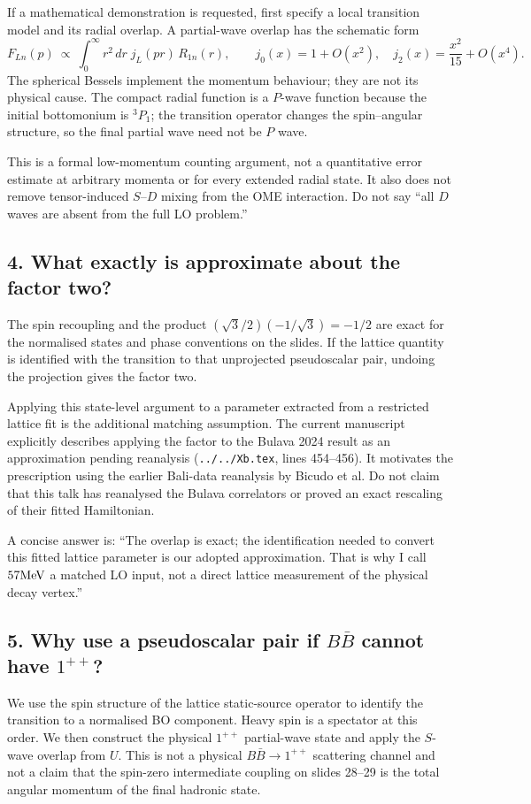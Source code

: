\documentclass[11pt,a4paper]{article}
\begin{document}
If a mathematical demonstration is requested, first specify a local
transition model and its radial overlap. A partial-wave overlap has the
schematic form
\[
 F_{Ln}(p)\ \propto\ \int_0^\infty r^2\,dr\;j_L(pr)\,R_{1n}(r),
 \qquad
 j_0(x)=1+O(x^2),\quad j_2(x)=\frac{x^2}{15}+O(x^4).
\]
The spherical Bessels implement the momentum behaviour; they are not its
physical cause. The compact radial function is a $P$-wave function because
the initial bottomonium is ${}^3P_1$; the transition operator changes the
spin--angular structure, so the final partial wave need not be $P$ wave.

This is a formal low-momentum counting argument, not a quantitative
error estimate at arbitrary momenta or for every extended radial state.
It also does not remove tensor-induced $S$--$D$ mixing from the OME
interaction. Do not say ``all $D$ waves are absent from the full LO problem.''

\subsection*{4. What exactly is approximate about the factor two?}
The spin recoupling and the product
$(\sqrt3/2)(-1/\sqrt3)=-1/2$ are exact for the normalised states and
phase conventions on the slides. If the lattice quantity is identified
with the transition to that unprojected pseudoscalar pair, undoing the
projection gives the factor two.

Applying this state-level argument to a parameter extracted from a
restricted lattice fit is the additional matching assumption. The
current manuscript explicitly describes applying the factor to the
Bulava 2024 result as an approximation pending reanalysis
(\texttt{../../Xb.tex}, lines 454--456). It motivates the prescription
using the earlier Bali-data reanalysis by Bicudo et al. Do not claim
that this talk has reanalysed the Bulava correlators or proved an exact
rescaling of their fitted Hamiltonian.

A concise answer is: ``The overlap is exact; the identification needed
to convert this fitted lattice parameter is our adopted approximation.
That is why I call $57\mathrm{MeV}$ a matched LO input, not a direct lattice
measurement of the physical decay vertex.''

\subsection*{5. Why use a pseudoscalar pair if $B\bar B$ cannot have $1^{++}$?}
We use the spin structure of the lattice static-source operator to
identify the transition to a normalised BO component. Heavy spin is a
spectator at this order. We then construct the physical $1^{++}$
partial-wave state and apply the $S$-wave overlap from $U$. This is not
a physical $B\bar B\to1^{++}$ scattering channel and not a claim
that the spin-zero intermediate coupling on slides 28--29 is the total
angular momentum of the final hadronic state.
\end{document}
